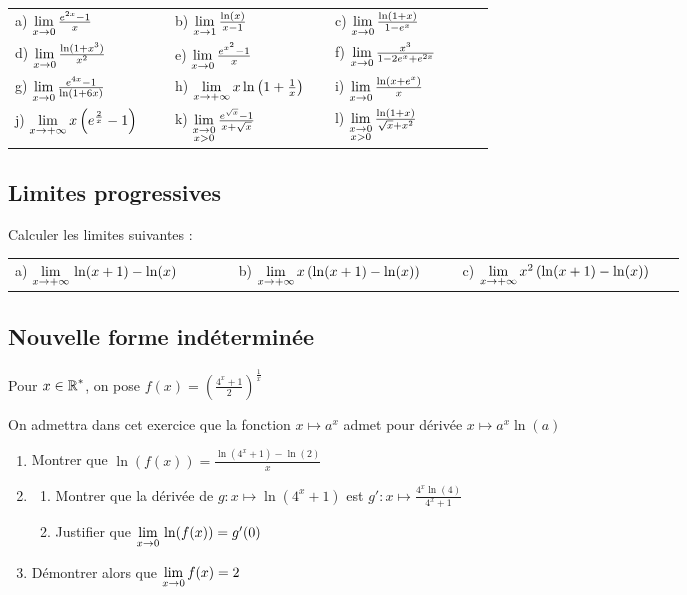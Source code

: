 \documentclass[oneside,12pt]{book}          %
\begin{document}
\begin{tabular}{p{0.3\linewidth}p{0.3\linewidth}p{0.3\linewidth}}
    a) ${\lim\limits_{\substack{x\to0}}}\, \frac{e^{2x}-1}{x}$ & b) ${\lim\limits_{\substack{x\to1}}}\,\frac{\ln(x)}{x-1}$ & c) ${\lim\limits_{\substack{x\to0}}}\,\frac{\ln(1+x)}{1-e^x}$ \\
    d) ${\lim\limits_{\substack{x\to0}}}\,\frac{\ln(1+x^3)}{x^2}$ & e) ${\lim\limits_{\substack{x\to0}}}\,\frac{e^{x^2}-1}{x}$ & f) ${\lim\limits_{\substack{x\to0}}}\,\frac{x^3}{1-2e^x+e^{2x}}$ \\
    g) ${\lim\limits_{\substack{x\to0}}}\,\frac{e^{4x}-1}{\ln(1+6x)}$ & h) ${\lim\limits_{\substack{x\to+\infty}}}\,x\ln\left(1+\frac{1}{x}\right)$ & i) ${\lim\limits_{\substack{x\to0}}}\,\frac{\ln(x+e^x)}{x}$ \\
    j) ${\lim\limits_{x\to +\infty}}\, x\left(e^\frac{2}{x}-1\right)$ & k) ${\lim\limits_{\substack{x\to0\\x>0}}}\,\frac{e^{\sqrt{x}}-1}{x+\sqrt{x}}$ & l) ${\lim\limits_{\substack{x\to0\\x>0}}}\, \frac{\ln(1+x)}{\sqrt{x}+x^2}$
\end{tabular}



\subsection{Limites progressives}
Calculer les limites suivantes :

\begin{tabular}{p{0.3\linewidth}p{0.3\linewidth}p{0.3\linewidth}}
	a) ${\lim\limits_{x\to +\infty}}\, \ln(x+1)-\ln(x)$ & b) ${\lim\limits_{x\to +\infty}}\, x\left(\ln(x+1)-\ln(x)\right)$ & c) ${\lim\limits_{x\to +\infty}}\, x^2\left(\ln(x+1)-\ln(x)\right)$
\end{tabular}



\subsection{Nouvelle forme indéterminée}
Pour ${x\in\mathbb R}^*$, on pose $f(x)=\left(\frac{4^x+1}{2}\right)^\frac{1}{x}$

On admettra dans cet exercice que la fonction $x\mapsto a^x$ admet pour dérivée $x\mapsto a^x\ln(a)$
\begin{enumerate}
    \item Montrer que $\ln(f(x))=\frac{\ln(4^x+1)-\ln(2)}{x}$
    \item \begin{enumerate}
        \item Montrer que la dérivée de $g:x\mapsto\ln(4^x+1)$ est $g':x\mapsto\frac{4^x\ln(4)}{4^x+1}$
        \item Justifier que ${\lim\limits_{\substack{x\to0}}}\,\ln(f(x))=g'(0)$
    \end{enumerate}
    \item Démontrer alors que ${\lim\limits_{\substack{x\to0}}}\,f(x)=2$
\end{enumerate}
\end{document}
